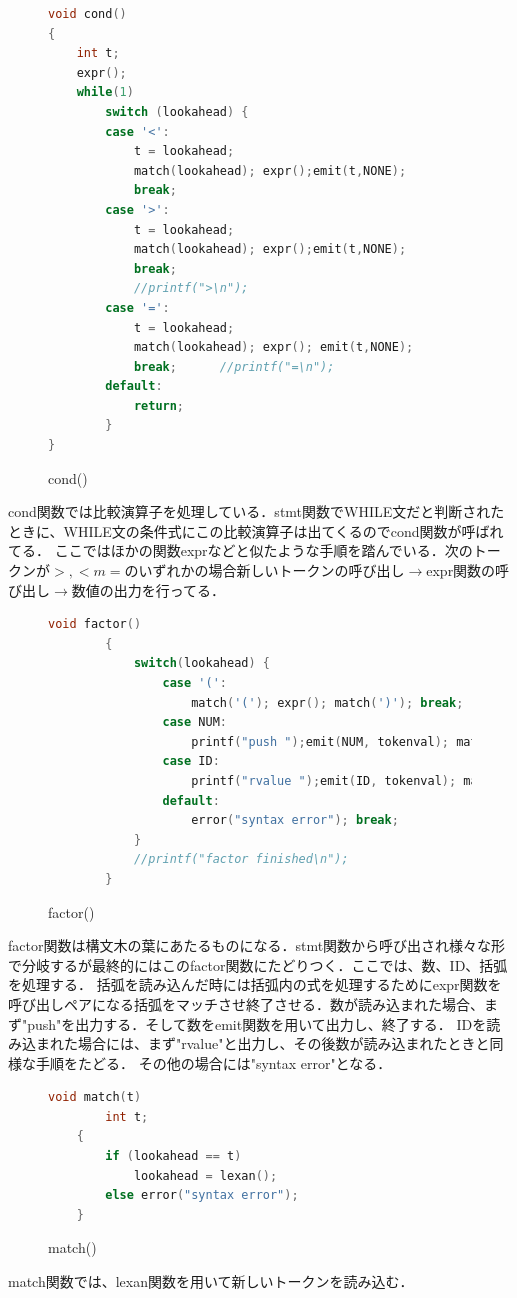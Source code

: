 \documentclass[fleqn, a4paper. 12pt]{ltjsarticle} %
\begin{document}
  \begin{figure}[H]
    \centering
    \begin{lstlisting}[language=C, caption={}, label=sample-code]
      void cond()
{
	int t;
	expr();
	while(1)
		switch (lookahead) {
		case '<':
			t = lookahead;
			match(lookahead); expr();emit(t,NONE);
			break;
		case '>':
			t = lookahead;
			match(lookahead); expr();emit(t,NONE);
			break;
			//printf(">\n");
		case '=':
			t = lookahead;
			match(lookahead); expr(); emit(t,NONE);	
			break;		//printf("=\n");
		default:
			return;
		}
}
    \end{lstlisting}
    \caption{cond()}
    \label{cond}
  \end{figure}

  cond関数では比較演算子を処理している．stmt関数でWHILE文だと判断されたときに、WHILE文の条件式にこの比較演算子は出てくるのでcond関数が呼ばれてる．
  ここではほかの関数exprなどと似たような手順を踏んでいる．次のトークンが$>,<m=$のいずれかの場合新しいトークンの呼び出し$\rightarrow$expr関数の呼び出し$\rightarrow$数値の出力を行ってる．

  \begin{figure}[H]
	\centering
	\begin{lstlisting}[language=C, caption={}, label=sample-code]
		void factor()
		{
			switch(lookahead) {
				case '(':
					match('('); expr(); match(')'); break;
				case NUM:
					printf("push ");emit(NUM, tokenval); match(NUM); break;
				case ID:
					printf("rvalue ");emit(ID, tokenval); match(ID); break;
				default:
					error("syntax error"); break;
			}
			//printf("factor finished\n");
		}
	\end{lstlisting}
	\caption{factor()}
	\label{factor}
  \end{figure}
  factor関数は構文木の葉にあたるものになる．stmt関数から呼び出され様々な形で分岐するが最終的にはこのfactor関数にたどりつく．ここでは、数、ID、括弧を処理する．
  括弧を読み込んだ時には括弧内の式を処理するためにexpr関数を呼び出しペアになる括弧をマッチさせ終了させる．数が読み込まれた場合、まず"push"を出力する．そして数をemit関数を用いて出力し、終了する．
IDを読み込まれた場合には、まず"rvalue"と出力し、その後数が読み込まれたときと同様な手順をたどる．
  その他の場合には"syntax error"となる．


  \begin{figure}[H]
	\centering
	\begin{lstlisting}[language=C, caption={}, label=sample-code]
		void match(t)
		int t;
	{
		if (lookahead == t)
			lookahead = lexan();
		else error("syntax error");
	}
	\end{lstlisting}
	\caption{match()}
	\label{match}
  \end{figure}
  match関数では、lexan関数を用いて新しいトークンを読み込む．
\end{document}
